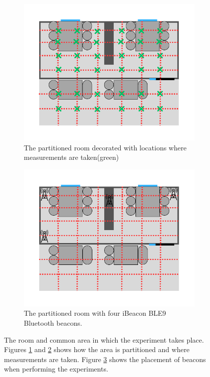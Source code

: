 \begin{figure}
\begin{subfigure}[b]{0.48\textwidth}
        \label{fig:room_partition}
    \end{subfigure}
    \begin{subfigure}[b]{0.48\textwidth}
        \includegraphics[width=\textwidth]{images/roomwithgridandmeasurements.png}
        \caption{The partitioned room decorated with locations where measurements are taken(green)}
        \label{fig:room_partition_measurements}
    \end{subfigure}
    \begin{subfigure}[b]{0.48\textwidth}
        \includegraphics[width=\textwidth]{images/gridwithbeacons.png}
        \caption{The partitioned room with four iBeacon BLE9 Bluetooth beacons. }
        \label{fig:room_partition_beacons}
    \end{subfigure}
    \caption{The room and common area in which the experiment takes place. Figures \ref{fig:room_partition} and \ref{fig:room_partition_measurements} shows how the area is partitioned and where measurements are taken. Figure \ref{fig:room_partition_beacons} shows the placement of beacons when performing the experiments. }
    \label{fig:allfiguresForTheGridPartition}
\end{figure}

